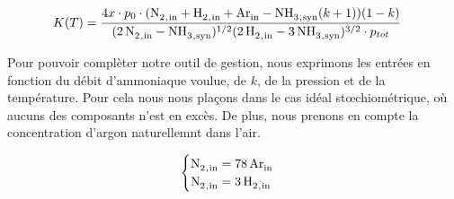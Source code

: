 \begin{align}
 K(T) & = \frac{4x\cdot p_0\cdot (\ce{N2_{,in} + H2_{,in} + Ar_{in}} - \ce{NH3_{,syn}}(k + 1)) (1 - k)}{(\ce{2N2_{,in} - NH3_{,syn}})^{1/2} (\ce{2H2_{,in} - 3NH3_{,syn}})^{3/2} \cdot p_{tot}}
 \label{eq:finale}
\end{align}

Pour pouvoir complèter notre outil de gestion, nous exprimons les entrées en fonction du débit d'ammoniaque voulue, de $k$, de la pression et de la température. Pour cela nous nous plaçons dans le cas idéal stœchiométrique, où aucuns des composants n'est en excès. De plus, nous prenons en compte la concentration d'argon naturellemnt dans l'air. 
 
$$
\begin{cases}
 \ce{N2_{,in}} = \ce{78Ar_{in}}\\ 
 \ce{N2_{,in}} = \ce{3H2_{,in}} \\
\end{cases}
$$


